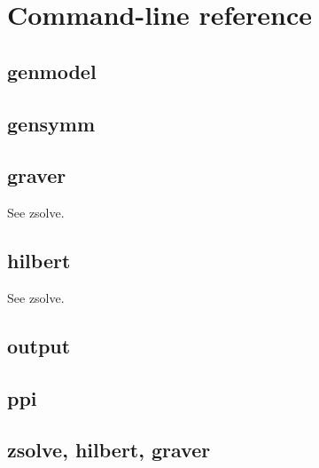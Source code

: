\chapter{Command-line reference}
\label{Chapter: Reference}

\section{genmodel}
{\small
}

\clearpage
\section{gensymm}
{\small
}

\clearpage
\section{graver}

See zsolve.

\clearpage
\section{hilbert}

See zsolve.


\clearpage
\section{output}
{\small
}

\clearpage
\section{ppi}
{\small
}

\clearpage
\section{zsolve, hilbert, graver}
{\small
}


